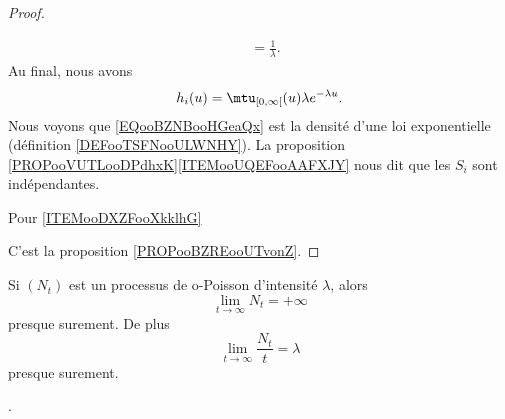 \begin{proof}
\begin{subproof}
\begin{subequations}
\begin{align}
				                                                                       & =\frac{1}{ \lambda }.
			\end{align}
		\end{subequations}
		Au final, nous avons
		\begin{equation}        \label{EQooBZNBooHGeaQx}
			h_i(u)=\mtu_{\mathopen[ 0 , \infty \mathclose[}(u)\lambda  e^{-\lambda u}.
		\end{equation}
		\spitem[Conclusions]
		Nous voyons que \eqref{EQooBZNBooHGeaQx} est la densité d'une loi exponentielle (définition \ref{DEFooTSFNooULWNHY}). La proposition \ref{PROPooVUTLooDPdhxK}\ref{ITEMooUQEFooAAFXJY} nous dit que les \( S_i\) sont indépendantes.
	\end{subproof}


	\begin{center}
		Pour \ref{ITEMooDXZFooXkklhG}
	\end{center}
	C'est la proposition \ref{PROPooBZREooUTvonZ}.

\end{proof}


\begin{proposition}
	Si \( (N_t)\) est un processus de o-Poisson d'intensité \( \lambda\), alors
	\begin{equation}
		\lim_{t\to \infty} N_t=+\infty
	\end{equation}
	presque surement. De plus
	\begin{equation}        \label{EqvaVYAs}
		\lim_{t\to \infty} \frac{ N_t }{ t }=\lambda
	\end{equation}
	presque surement.
\end{proposition}
.

